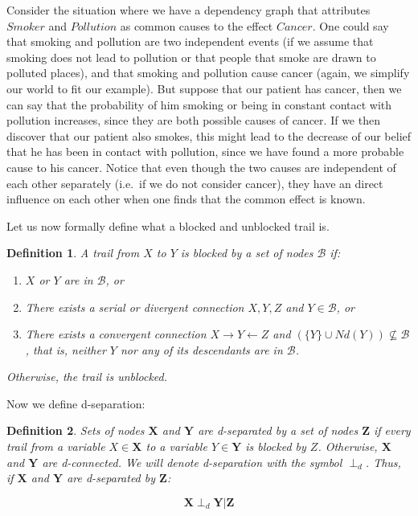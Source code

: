 \documentclass{amsart}
\theoremstyle{plain}
\newtheorem*{definition}{Definition}
\begin{document}
Consider the situation where we have a dependency graph that attributes $Smoker$ and $Pollution$ as
common causes to the effect $Cancer$. One could say that smoking and pollution are two independent
events (if we assume that smoking does not lead to pollution or that people that smoke are drawn to
polluted places), and that smoking and pollution cause cancer (again, we simplify our world to fit
our example). But suppose that our patient has cancer, then we can say that the probability of him
smoking or being in constant contact with pollution increases, since they are both possible causes
of cancer. If we then discover that our patient also smokes, this might lead to the decrease of our
belief that he has been in contact with pollution, since we have found a more probable cause to his
cancer. Notice that even though the two causes are independent of each other separately (i.e.\ if
we do not consider cancer), they have an direct influence on each other when one finds that the
common effect is known.

Let us now formally define what a blocked and unblocked trail is.

\begin{definition}
  A trail from $X$ to $Y$ is blocked by a set of nodes $\mathcal{B}$ if:
  \begin{enumerate}
    \item $X$ or $Y$ are in $\mathcal{B}$, or
    \item There exists a serial or divergent connection $X,Y,Z$ and $Y\in\mathcal{B}$, or
    \item There exists a convergent connection $X\rightarrow Y\leftarrow Z$ and $(\{Y\}\cup Nd(Y))
      \not\subseteq\mathcal{B}$, that is, neither $Y$ nor any of its descendants are in
      $\mathcal{B}$.
  \end{enumerate}
  Otherwise, the trail is unblocked.
\end{definition}

Now we define d-separation:

\begin{definition}
  Sets of nodes $\mathbf{X}$ and $\mathbf{Y}$ are d-separated by a set of nodes $\mathbf{Z}$ if
  every trail from a variable $X\in\mathbf{X}$ to a variable $Y\in\mathbf{Y}$ is blocked by $Z$.
  Otherwise, $\mathbf{X}$ and $\mathbf{Y}$ are d-connected. We will denote d-separation with the
  symbol $\perp_d$. Thus, if $\mathbf{X}$ and $\mathbf{Y}$ are d-separated by $\mathbf{Z}$:

  \begin{equation*}
    \mathbf{X} \perp_d \mathbf{Y} | \mathbf{Z}
  \end{equation*}
\end{definition}
\end{document}
